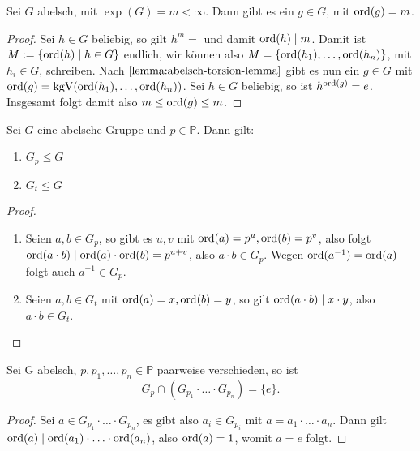 \begin{corollary}
    Sei $G$ abelsch, mit $\exp(G) = m < \infty$. Dann gibt es ein $g \in G$, mit $\operatorname{ord}(g) = m$.
\end{corollary}

\begin{proof}
    Sei $h \in G$ beliebig, so gilt $h^m = $ und damit $\operatorname{ord}(h) \mid m$. Damit ist $M := \{ \operatorname{ord}(h) \mid h \in G \}$ endlich, wir können also $M = \{ \operatorname{ord}(h_1), \hdots, \operatorname{ord}(h_n) \}$, mit $h_i \in G$, schreiben. Nach $\cref{lemma:abelsch-torsion-lemma}$ gibt es nun ein $g \in G$ mit $\operatorname{ord}(g) = \mathrm{kgV}(\operatorname{ord}(h_1), \hdots, \operatorname{ord}(h_n))$. Sei $h \in G$ beliebig, so ist $h^{\operatorname{ord}(g)} = e$. Insgesamt folgt damit also $m \leq \operatorname{ord}(g) \leq m$.
\end{proof}

\begin{lemma}
    Sei $G$ eine abelsche Gruppe und $p \in \mathbb{P}$. Dann gilt:
    \begin{enumerate}
        \item $G_p \leq G$
        \item $G_t \leq G$
    \end{enumerate}
\end{lemma}

\begin{proof}{\ }
    \begin{enumerate}
        \item Seien $a, b \in G_p$, so gibt es $u, v$ mit $\operatorname{ord}(a) = p^u, \operatorname{ord}(b) = p^v$, also folgt $\operatorname{ord}(a \cdot b) \mid \operatorname{ord}(a) \cdot \operatorname{ord}(b) = p^{u+v}$, also $a \cdot b \in G_p$. Wegen $\operatorname{ord}(a^{-1}) = \operatorname{ord}(a)$ folgt auch $a^{-1} \in G_p$.
        \item Seien $a, b \in G_t$ mit $\operatorname{ord}(a) = x, \operatorname{ord}(b) = y$, so gilt $ \operatorname{ord}(a \cdot b) \mid x \cdot y$, also $a \cdot b \in G_t$.
    \end{enumerate}
\end{proof}

\begin{lemma} \label{lemma:p-anteile-verschieden}
    Sei G abelsch, $p, p_1, \hdots, p_n \in \mathbb{P}$ paarweise verschieden, so ist
    $$ G_p \cap ( G_{p_1} \cdot \hdots \cdot G_{p_n} ) = \{ e \}. $$
\end{lemma}

\begin{proof}
    Sei $a \in G_{p_1} \cdot \hdots \cdot G_{p_n}$, es gibt also $a_i \in G_{p_i}$ mit $a = a_1 \cdot \hdots \cdot a_n$. Dann gilt $\operatorname{ord}(a) \mid \operatorname{ord}(a_1) \cdot \hdots \cdot \operatorname{ord}(a_n)$, also $\operatorname{ord}(a) = 1$, womit $a = e$ folgt.
\end{proof}

